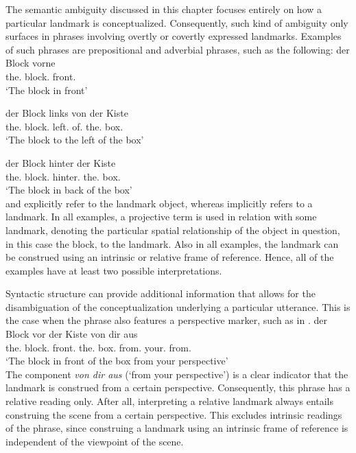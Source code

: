 The semantic ambiguity discussed in this chapter 
focuses entirely on how a particular landmark is conceptualized.
Consequently, such kind of ambiguity only surfaces in phrases involving 
overtly or covertly expressed landmarks. Examples
of such phrases are prepositional and adverbial phrases, such as 
the following:
\ea
\label{e:der-block-vorne-repeated}
\gll der Block vorne\\
the.{\NOM} block.{\NOM} front.{\ADV} \\
\glt `The block in front'\\
\item
\label{e:der-block-links-von-der-kiste}
\gll der Block links von der Kiste \\
the.{\NOM} block.{\NOM} left.{\ADV} of.{\PREP} the.{\DAT} box.{\DAT} \\
\glt `The block to the left of the box'\\
\item
\label{e:der-block-hinter-der-kiste}
\gll der Block hinter der Kiste  \\
the.{\NOM} block.{\NOM} hinter.{\PREP} the.{\DAT} box.{\DAT} \\
\glt `The block in back of the box'\\
\z
{} and  
explicitly refer to the landmark object, whereas 
 implicitly refers to a landmark. 
In all examples, a projective term is used in relation with some landmark, 
denoting the particular spatial relationship of the object
in question, in this case the block, to the landmark. 
Also in all examples, the landmark can be construed using an intrinsic or 
relative frame of reference. Hence, all of the examples have at least two 
possible interpretations.

Syntactic structure can provide additional information that allows
for the disambiguation of the conceptualization underlying a particular utterance. 
This is the case when the phrase also features a perspective marker, 
such as in .
\ea
\label{e:der-block-vor-der-kiste-von-dir-aus}
\gll der Block vor der Kiste von dir aus \\
the.{\NOM} block.{\NOM} front.{\PREP} the.{\DAT} box.{\DAT} from.{\PREP} your.{\DAT} from.{\PREP}\\
\glt `The block in front of the box from your perspective'\\
\z
The component \textit{von dir aus} (`from your perspective') is a clear indicator that
the landmark is construed from a certain perspective. Consequently, this phrase 
has a relative reading only. After all, interpreting a relative landmark always entails 
construing the scene from a certain perspective.
This excludes intrinsic readings of the phrase, since construing 
a landmark using an intrinsic frame of reference is independent of the viewpoint of the scene. 


